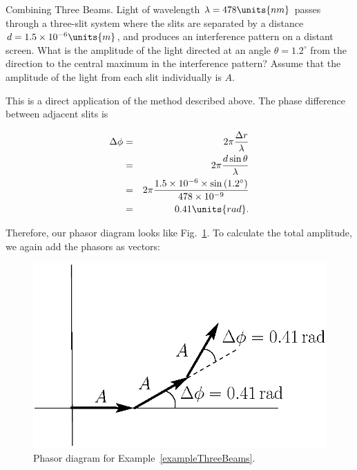 \begin{example}{Combining Three Beams.} 
\label{exampleThreeBeams}
Light of wavelength $\lambda = 478\units{nm}$ passes
through a three-slit system where the slits are separated by a
distance $d = 1.5 \times 10^{-6}\units{m}$, and produces an
interference pattern on a distant screen. What is the amplitude of the
light directed at an angle $\theta = 1.2^\circ$ from the direction to
the central maximum in the interference pattern? Assume that the
amplitude of the light from each slit individually is $A$.
\begin{solution}
This is a direct application of the method described above. The phase
difference between adjacent slits is

\begin{eqnarray*}
\Delta \phi & = & 2\pi \frac{\Delta r}{\lambda}\\
            & = & 2\pi \frac{d\sin{\theta}}{\lambda} \\
            & = & 2\pi \frac{1.5 \times 10^{-6}\times \sin{(1.2^\circ)}}
            {478 \times 10^{-9}} \\
            & = & 0.41\units{rad}.\\
\end{eqnarray*}

Therefore, our phasor diagram looks like Fig.~\ref{fig:phasor22}.
To calculate the total amplitude, we again add the phasors as vectors:

\begin{figure}[b]
\begin{center}
 \includegraphics[width=2.4truein]{phasors/phasor22} 
\caption{\label{fig:phasor22}Phasor diagram for Example~\ref{exampleThreeBeams}.}
\end{center}
\end{figure}



\end{solution}
\end{example}

